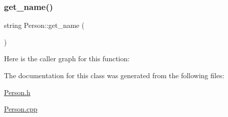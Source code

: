 \mbox{\label{class_person_a0c69dd4500c6d730aae6605d664c11c9}} 
\subsubsection{\texorpdfstring{get\_name()}{get\_name()}}
{\footnotesize\ttfamily string Person\+::get\+\_\+name (\begin{DoxyParamCaption}{ }\end{DoxyParamCaption})}

Here is the caller graph for this function\+:


The documentation for this class was generated from the following files\+:\begin{DoxyCompactItemize}
\item 
\mbox{\hyperlink{_person_8h}{Person.\+h}}\item 
\mbox{\hyperlink{_person_8cpp}{Person.\+cpp}}\end{DoxyCompactItemize}
